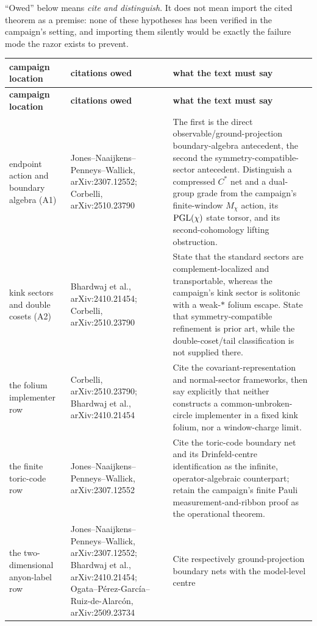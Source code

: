 ``Owed'' below means \emph{cite and distinguish}. It does not mean import the
cited theorem as a premise: none of these hypotheses has been verified in the
campaign's setting, and importing them silently would be exactly the failure
mode the razor exists to prevent.

{\small
\begin{longtable}{@{}p{}p{}p{}@{}}
\toprule
\textbf{campaign location} & \textbf{citations owed} & \textbf{what the text must say} \\
\midrule
\endfirsthead
\toprule
\textbf{campaign location} & \textbf{citations owed} & \textbf{what the text must say} \\
\midrule
\endhead
\bottomrule
\endlastfoot
endpoint action and boundary algebra (A1) &
Jones--Naaijkens--Penneys--Wallick, arXiv:2307.12552; Corbelli,
arXiv:2510.23790 &
The first is the direct observable/ground-projection boundary-algebra
antecedent, the second the symmetry-compatible-sector antecedent. Distinguish
a compressed $C^*$ net and a dual-group grade from the campaign's
finite-window $M_\chi$ action, its $\mathrm{PGL}(\chi)$ state torsor, and its
second-cohomology lifting obstruction. \\
\midrule
kink sectors and double cosets (A2) &
Bhardwaj et al., arXiv:2410.21454; Corbelli, arXiv:2510.23790 &
State that the standard sectors are complement-localized and transportable,
whereas the campaign's kink sector is solitonic with a weak-$*$ folium escape.
State that symmetry-compatible refinement is prior art, while the
double-coset/tail classification is not supplied there. \\
\midrule
the folium implementer row &
Corbelli, arXiv:2510.23790; Bhardwaj et al., arXiv:2410.21454 &
Cite the covariant-representation and normal-sector frameworks, then say
explicitly that neither constructs a common-unbroken-circle implementer in a
fixed kink folium, nor a window-charge limit. \\
\midrule
the finite toric-code row &
Jones--Naaijkens--Penneys--Wallick, arXiv:2307.12552 &
Cite the toric-code boundary net and its Drinfeld-centre identification as the
infinite, operator-algebraic counterpart; retain the campaign's finite Pauli
measurement-and-ribbon proof as the operational theorem. \\
\midrule
the two-dimensional anyon-label row &
Jones--Naaijkens--Penneys--Wallick, arXiv:2307.12552; Bhardwaj et al.,
arXiv:2410.21454; Ogata--P\'erez-Garc\'ia--Ruiz-de-Alarc\'on,
arXiv:2509.23734 &
Cite respectively ground-projection boundary nets with the model-level centre

\end{longtable}}
